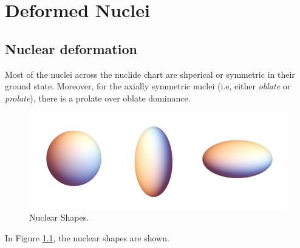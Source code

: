 \chapter{Deformed Nuclei}

\section{Nuclear deformation}

Most of the nuclei across the nuclide chart are shperical or symmetric in their ground state. Moreover, for the axially symmetric nuclei (i.e, either \emph{oblate} or \emph{prolate}), there is a prolate over oblate dominance.

\begin{figure}
    \centering
    \includegraphics[scale=0.3]{Chapters/Figures/nuclear_shapes.png}
    \caption{Nuclear Shapes.}
    \label{nuclear_shapes}
\end{figure}

In Figure \ref{nuclear_shapes}, the nuclear shapes are shown.